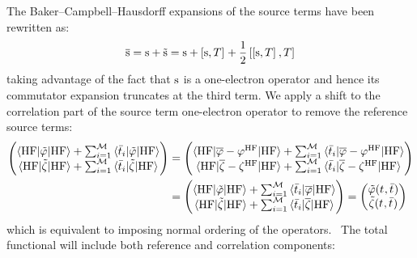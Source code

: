 The Baker--Campbell--Hausdorff expansions of the source terms have been
rewritten as:
\begin{equation}
  \overline{\mathrm{s}} = \mathrm{s} + \tilde{\mathrm{s}} = \mathrm{s} + \left[ \mathrm{s}, T \right]^{}
  + \frac{1}{2}\left[ \left[ \mathrm{s}, T \right]^{}, T \right]^{}
\end{equation}
taking advantage of the fact that $\mathrm{s}$ is a one-electron operator and
hence its commutator expansion truncates at the third term.
We apply a shift to the correlation part of the source term
one-electron operator to remove the reference source terms:
\begin{equation}
  \begin{aligned}
  \begin{pmatrix}
   \braket{\mathrm{HF} | \tilde{\varphi} | \mathrm{HF}}
  + \sum_{i=1}^{\mathcal{M}}\braket{\bar{t}_{i} | \tilde{\varphi} | \mathrm{HF}} \\
   \braket{\mathrm{HF} | \tilde{\zeta} | \mathrm{HF}}
  + \sum_{i=1}^{\mathcal{M}}\braket{\bar{t}_{i} | \tilde{\zeta} | \mathrm{HF}}
  \end{pmatrix}
  &=
  \begin{pmatrix}
    \braket{\mathrm{HF} | \overline{\varphi} - \varphi^\mathrm{HF} | \mathrm{HF}}
  + \sum_{i=1}^{\mathcal{M}}\braket{\bar{t}_{i} | \overline{\varphi} - \varphi^\mathrm{HF} | \mathrm{HF}} \\
  \braket{\mathrm{HF} | \overline{\zeta} - \zeta^\mathrm{HF} | \mathrm{HF}}
  + \sum_{i=1}^{\mathcal{M}}\braket{\bar{t}_{i} | \overline{\zeta} -
  \zeta^\mathrm{HF}| \mathrm{HF}}
  \end{pmatrix}
  \\
  &=
  \begin{pmatrix}
   \braket{\mathrm{HF} | \tilde{\varphi} | \mathrm{HF}}
  + \sum_{i=1}^{\mathcal{M}}\braket{\bar{t}_{i} | \overline{\varphi} | \mathrm{HF}} \\
   \braket{\mathrm{HF} | \tilde{\zeta} | \mathrm{HF}}
  + \sum_{i=1}^{\mathcal{M}}\braket{\bar{t}_{i} | \overline{\zeta} | \mathrm{HF}}
  \end{pmatrix}
  =
  \begin{pmatrix}
    \tilde{\varphi}(t_{}, \bar{t}_{}) \\
    \tilde{\zeta}(t_{}, \bar{t}_{})
  \end{pmatrix}
\end{aligned}
\end{equation}
which is equivalent to imposing normal ordering of the
operators.~\autocite{Shavitt}
The total functional will include both reference and correlation
components:
